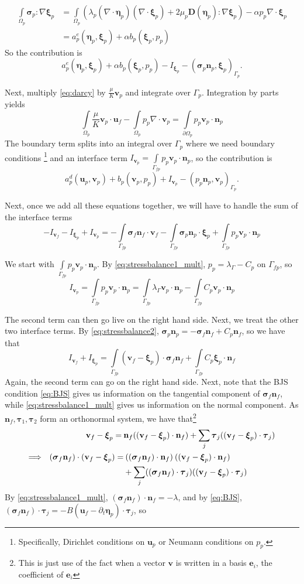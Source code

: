 \documentclass{article}
\newcommand{\mathspace}[1]{\ensuremath{#1}\xspace} %
\newcommand{\D}{\mathspace{\mathbf{D}}}
\newcommand{\sigmabf}{\mathspace{\boldsymbol{\sigma}}}
\newcommand{\grad}{\mathspace{\nabla}}
\renewcommand{\div}{\mathspace{\nabla \cdot}}
\newcommand{\ddt}[1]{\mathspace{\partial_t #1}}
\newcommand{\taubf}{\mathspace{\boldsymbol{\tau}}}
\newcommand{\darcy}{\mathspace{\Omega_{p}}}
\newcommand{\darcybdy}{\mathspace{\Gamma_{p}}}
\newcommand{\interface}{\mathspace{\Gamma_{fp}}}
\newcommand{\nf}{\mathspace{\mathbf{n}_f}}
\newcommand{\np}{\mathspace{\mathbf{n}_p}}
\newcommand{\intD}{\mathspace{\int \limits_{\darcy}}}
\newcommand{\intDbdyI}{\mathspace{\int \limits_{\partial \darcy}}}
\newcommand{\intI}{\mathspace{\int \limits_{\interface}}}
\newcommand{\uf}{\mathspace{\mathbf{u}_f}}
\newcommand{\vf}{\mathspace{\mathbf{v}_f}}
\newcommand{\up}{\mathspace{\mathbf{u}_p}}
\newcommand{\vp}{\mathspace{\mathbf{v}_p}}
\newcommand{\pp}{\mathspace{p_p}}
\newcommand{\disp}{\mathspace{\boldsymbol{\eta}_p}}
\newcommand{\disptest}{\mathspace{\boldsymbol{\xi}_p}}
\newcommand{\mult}{\mathspace{\lambda_{\Gamma}}}
\begin{document}
\begin{align*}
  \intD \sigmabf_p \colon \grad \disptest &=  \intD  \left ( \lambda_p (\div \disp)(\div \disptest)  + 2 \mu_p \D(\disp) \colon \grad \disptest \right)
                                            - \alpha \pp \div \disptest \\
                                          &= a^e_p(\disp, \disptest) + \alpha b_p(\disptest, \pp)
\end{align*}
So the contribution is $$a^e_p(\disp, \disptest) + \alpha b_p(\disptest, \pp) - I_{\disptest} - (\sigmabf_p\np, \disptest)_{\darcybdy}.$$

Next, multiply \eqref{eq:darcy} by $\frac {\mu} {K} \vp$ and integrate over \darcybdy. Integration by parts yields
$$ \intD \frac {\mu} {K} \vp \cdot \uf -  \intD \pp \div \vp = \intDbdyI \pp \vp \cdot \np$$ 
The boundary term splits into an integral over \darcybdy where we need boundary conditions \footnote{Specifically, Dirichlet conditions on \up or Neumann conditions on \pp.} and an interface term $I_{\vp} = \intI \pp \vp \cdot \np$, so the contribution is
$$a_p^d(\up, \vp) + b_p(\vp, \pp) + I_{\vp} - (\pp \np, \vp)_{\darcybdy}.$$

Next, once we add all these equations together, we will have to handle the sum of the interface terms $$-I_{\vf} - I_{\disptest} + I_{\vp} = -\intI \sigmabf_f \nf \cdot \vf -\intI \sigmabf_p \np \cdot \disptest + \intI \pp \vp \cdot \np$$

We start with $\intI \pp \vp \cdot \np$. By \eqref{eq:stressbalance1_mult}, $\pp = \mult - C_p$ on \interface, so
$$I_{\vp} = \intI \pp \vp \cdot \np = \intI \mult \vp \cdot \np - \intI C_p \vp \cdot \np$$

The second term can then go live on the right hand side. Next, we treat the other two interface terms. By \eqref{eq:stressbalance2}, $\sigmabf_p \np = - \sigmabf_f \nf + C_p \nf$, so we have that $$I_{\vf} + I_{\disptest} = \intI (\vf - \disptest) \cdot \sigmabf_f \nf + \intI C_p \disptest \cdot  \nf$$
Again, the second term can go on the right hand side. Next, note that the BJS condition \eqref{eq:BJS} gives us information on the tangential component of $\sigmabf_f \nf$, while \eqref{eq:stressbalance1_mult} gives us information on the normal component. As $\nf, \taubf_1, \taubf_2$ form an orthonormal system, we have that\footnote{This is just use of the fact when a vector $\mathbf{v}$ is written in a basis $\mathbf{e}_i$, the coefficient of $\mathbf{e}_i$    }
\begin{align*}
  \vf - \disptest = \: &\nf ((\vf - \disptest) \cdot \nf) + \sum_j \taubf_j ((\vf - \disptest) \cdot \taubf_j) \\
  \Longrightarrow \hspace{0.02\textwidth}  (\sigmabf_f \nf) \cdot (\vf - \disptest) = & \: ((\sigmabf_f \nf) \cdot \nf) \: ((\vf - \disptest) \cdot \nf) \\
  & + \sum_j ((\sigmabf_f \nf) \cdot \taubf_j) ((\vf - \disptest) \cdot \taubf_j)
\end{align*}
By \eqref{eq:stressbalance1_mult}, $(\sigmabf_f \nf) \cdot \nf = -\lambda$, and by \eqref{eq:BJS}, $(\sigmabf_f \nf) \cdot \taubf_j = -B \left ( \uf - \ddt{\disp} \right ) \cdot \taubf_j$, so
\end{document}
